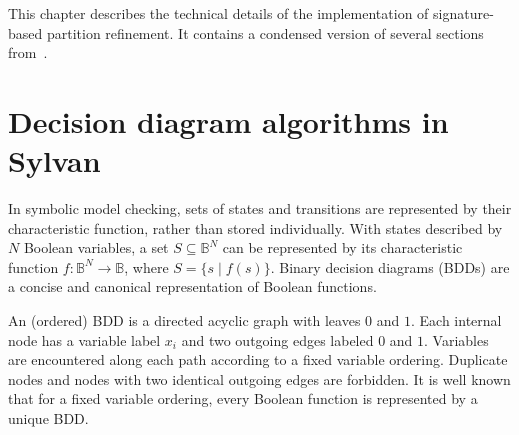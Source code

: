 
This chapter describes the technical details of the implementation of signature-based partition refinement.
It contains a condensed version of several sections from~\cite{DBLP:conf/tacas/DijkP16}.


\section{Decision diagram algorithms in Sylvan}


In {symbolic model checking}, sets of states and transitions are represented by their characteristic function, rather than stored individually.
With states described by $N$ Boolean variables,
a set $S\subseteq \mathbb{B}^N$ can be represented by its characteristic function $f\colon \mathbb{B}^N\rightarrow \mathbb{B}$, where $S=\{s\mid f(s)\}$.
%
%
%
Binary decision diagrams (BDDs) are a concise and canonical representation of Boolean functions.

An (ordered) BDD is a directed acyclic graph with leaves $0$ and $1$. Each internal node has a variable label $x_i$ and two outgoing edges labeled $0$ and $1$. Variables are encountered along each path according to a fixed variable ordering. Duplicate nodes and nodes with two identical outgoing edges are forbidden.
%
%
%
It is well known that for a fixed variable ordering, every Boolean function is represented by a unique BDD.


